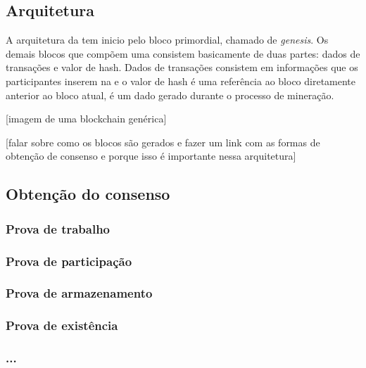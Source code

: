 \documentclass[tcc,capa]{texufpel}
\begin{document}
	
	

	\subsection{Arquitetura}
    
    A arquitetura da \bchain tem inicio pelo bloco primordial, chamado de \textit{genesis}. Os demais blocos que compõem uma \bchain consistem basicamente de duas partes: dados de transações e valor de hash. Dados de transações consistem em informações que os participantes inserem na \bchain e o valor de hash é uma referência ao bloco diretamente anterior ao bloco atual, é um dado gerado durante o processo de mineração.

    [imagem de uma blockchain genérica]
    
    [falar sobre como os blocos são gerados e fazer um link com as formas de obtenção de consenso e porque isso é importante nessa arquitetura]

	\subsection{Obtenção do consenso}
    
    	\subsubsection{Prova de trabalho}
        
        \subsubsection{Prova de participação}
        
        \subsubsection{Prova de armazenamento}
        
        \subsubsection{Prova de existência}
        
        \subsubsection{...}
        
\end{document}
